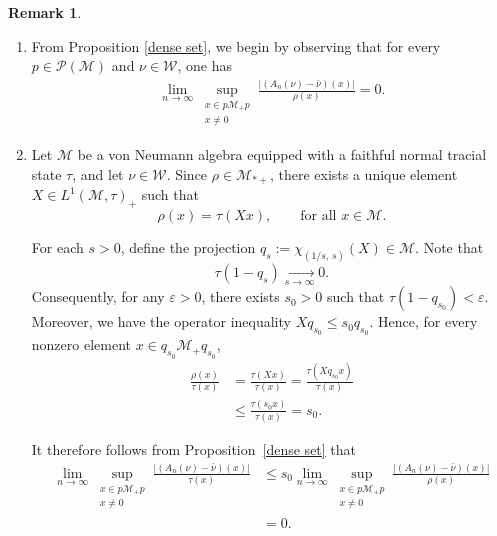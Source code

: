 \documentclass[11pt]{amsart}
\theoremstyle{definition}
\theoremstyle{myremark}
\newtheorem{rem}[thm]{Remark}
\numberwithin{equation}{section}
\newcommand{\CM}{\mathcal{M}}
\newcommand{\CP}{\mathcal{P}}
\newcommand{\CW}{\mathcal{W}}
\newcommand{\abs}[1]{\left\vert#1\right\vert}
\begin{document}
\begin{rem}\label{dense set-rem1}
\begin{enumerate}
	\item From Proposition \ref{dense set}, we begin by observing that for every $p \in \CP(\CM)$ and $\nu \in \CW$, one has
	\begin{align*}
		\lim_{n \to \infty} 
		\sup_{\substack{x \in p\CM_+p \\ x \neq 0}}
		\frac{\abs{(A_n(\nu)-\bar{\nu})(x)}}{\rho(x)} = 0 .
	\end{align*}

	\item Let $\CM$ be a von Neumann algebra equipped with a faithful normal tracial state $\tau$, and let $\nu \in \CW$. Since $\rho \in \CM_{*+}$, there exists a unique element $X \in L^1(\CM,\tau)_+$ such that
	\[
		\rho(x) = \tau(Xx), \qquad \text{for all } x \in \CM .
	\]
	
	For each $s > 0$, define the projection $q_s := \chi_{(1/s,\, s)}(X) \in \CM$. Note that
	\[
		\tau(1 - q_s) \xrightarrow[s \to \infty]{} 0 .
	\]
	Consequently, for any $\varepsilon > 0$, there exists $s_0 > 0$ such that $\tau(1 - q_{s_0}) < \varepsilon$. Moreover, we have the operator inequality $X q_{s_0} \leq s_0 q_{s_0}$. Hence, for every nonzero element $x \in q_{s_0}\CM_+ q_{s_0}$,
	\begin{align*}
		\frac{\rho(x)}{\tau(x)} 
		&= \frac{\tau(Xx)}{\tau(x)} 
		= \frac{\tau(X q_{s_0} x)}{\tau(x)} \\
		&\leq \frac{\tau(s_0 x)}{\tau(x)} 
		= s_0 .
	\end{align*}
	
	\noindent It therefore follows from Proposition~\ref{dense set} that
	\begin{align*}
		\lim_{n \to \infty} 
		\sup_{\substack{x \in p\CM_+p \\ x \neq 0}}
		\frac{\abs{(A_n(\nu)-\bar{\nu})(x)}}{\tau(x)}
		&\leq s_0
		\lim_{n \to \infty} 
		\sup_{\substack{x \in p\CM_+p \\ x \neq 0}}
		\frac{\abs{(A_n(\nu)-\bar{\nu})(x)}}{\rho(x)} \\
		&= 0 .
	\end{align*}
\end{enumerate}
\end{rem}


	
	
\end{document}
